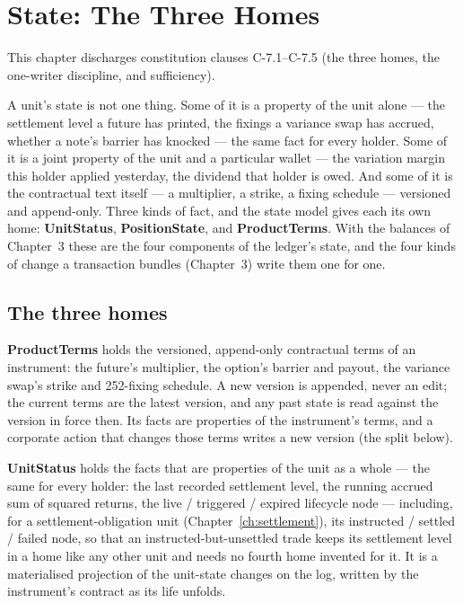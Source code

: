 \section{State: The Three Homes}\label{ch:homes}

This chapter discharges constitution clauses C-7.1--C-7.5 (the three homes, the one-writer discipline, and sufficiency).

A unit's state is not one thing. Some of it is a property of the unit alone --- the
settlement level a future has printed, the fixings a variance swap has accrued, whether a
note's barrier has knocked --- the same fact for every holder. Some of it is a joint
property of the unit and a particular wallet --- the variation margin this holder applied
yesterday, the dividend that holder is owed. And some of it is the contractual text
itself --- a multiplier, a strike, a fixing schedule --- versioned and append-only. Three
kinds of fact, and the state model gives each its own home: \textbf{UnitStatus},
\textbf{PositionState}, and \textbf{ProductTerms}. With the balances of Chapter~3
these are the four components of the ledger's state, and the four kinds of change a
transaction bundles (Chapter~3) write them one for one.

\subsection{The three homes}

\textbf{ProductTerms} holds the versioned, append-only contractual terms of an
instrument: the future's multiplier, the option's barrier and payout, the variance swap's
strike and 252-fixing schedule. A new version is appended, never an edit; the current
terms are the latest version, and any past state is read against the version in force
then. Its facts are properties of the instrument's terms, and a corporate action that
changes those terms writes a new version (the split below).

\textbf{UnitStatus} holds the facts that are properties of the unit as a whole --- the
same for every holder: the last recorded settlement level, the running accrued sum of
squared returns, the live / triggered / expired lifecycle node --- including, for a
settlement-obligation unit (Chapter~\ref{ch:settlement}), its instructed / settled /
failed node, so that an instructed-but-unsettled trade keeps its settlement level in a
home like any other unit and needs no fourth home invented for it. It is a materialised
projection of the unit-state changes on the log, written by the instrument's contract as
its life unfolds.

